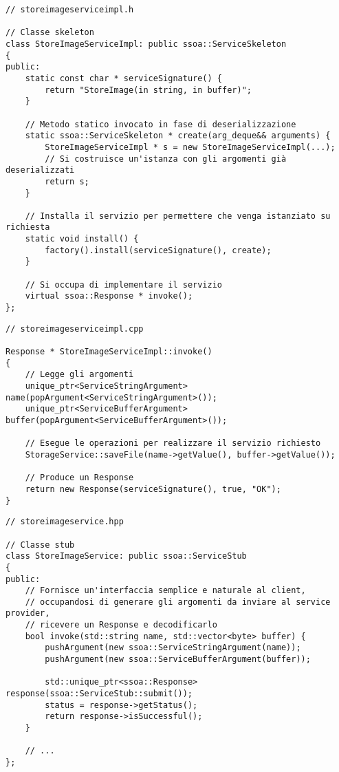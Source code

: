 \documentclass[a4paper,twoside]{article}
\begin{document}
\begin{lstlisting}
// storeimageserviceimpl.h

// Classe skeleton
class StoreImageServiceImpl: public ssoa::ServiceSkeleton
{
public:
    static const char * serviceSignature() {
        return "StoreImage(in string, in buffer)";
    }

    // Metodo statico invocato in fase di deserializzazione
    static ssoa::ServiceSkeleton * create(arg_deque&& arguments) {
        StoreImageServiceImpl * s = new StoreImageServiceImpl(...);
        // Si costruisce un'istanza con gli argomenti già deserializzati
        return s;
    }

    // Installa il servizio per permettere che venga istanziato su richiesta
    static void install() {
        factory().install(serviceSignature(), create);
    }

    // Si occupa di implementare il servizio
    virtual ssoa::Response * invoke();
};
\end{lstlisting}

\begin{lstlisting}
// storeimageserviceimpl.cpp

Response * StoreImageServiceImpl::invoke()
{
    // Legge gli argomenti
    unique_ptr<ServiceStringArgument> name(popArgument<ServiceStringArgument>());
    unique_ptr<ServiceBufferArgument> buffer(popArgument<ServiceBufferArgument>());

    // Esegue le operazioni per realizzare il servizio richiesto
    StorageService::saveFile(name->getValue(), buffer->getValue());

    // Produce un Response
    return new Response(serviceSignature(), true, "OK");
}
\end{lstlisting}

\begin{lstlisting}
// storeimageservice.hpp

// Classe stub
class StoreImageService: public ssoa::ServiceStub
{
public:
    // Fornisce un'interfaccia semplice e naturale al client,
    // occupandosi di generare gli argomenti da inviare al service provider,
    // ricevere un Response e decodificarlo
    bool invoke(std::string name, std::vector<byte> buffer) {
        pushArgument(new ssoa::ServiceStringArgument(name));
        pushArgument(new ssoa::ServiceBufferArgument(buffer));

        std::unique_ptr<ssoa::Response> response(ssoa::ServiceStub::submit());
        status = response->getStatus();
        return response->isSuccessful();
    }

    // ...
};
\end{lstlisting}
\end{document}
